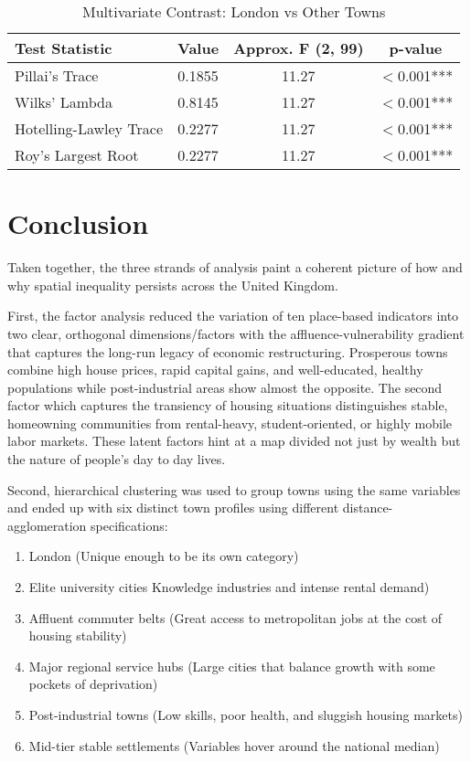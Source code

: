 \documentclass[12pt]{article}
\begin{document}
\begin{table}[htbp]
\centering
\caption{Multivariate Contrast: London vs Other Towns}
\label{tab:london_vs_other}
\begin{tabular}{lccc}
\hline
\textbf{Test Statistic} & \textbf{Value} & \textbf{Approx. F (2, 99)} & \textbf{p-value} \\
\hline
Pillai's Trace & 0.1855 & 11.27 & $<$0.001*** \\
Wilks' Lambda & 0.8145 & 11.27 & $<$0.001*** \\
Hotelling-Lawley Trace & 0.2277 & 11.27 & $<$0.001*** \\
Roy's Largest Root & 0.2277 & 11.27 & $<$0.001*** \\
\hline
\end{tabular}
\end{table}

\section{Conclusion}
Taken together, the three strands of analysis paint a coherent picture of how and why spatial inequality persists across the United Kingdom.

First, the factor analysis reduced the variation of ten place-based indicators into two clear, orthogonal dimensions/factors with the affluence-vulnerability gradient that captures the long-run legacy of economic restructuring. Prosperous towns combine high house prices, rapid capital gains, and well-educated, healthy populations while post-industrial areas show almost the opposite. The second factor which captures the transiency of housing situations distinguishes stable, homeowning communities from rental-heavy, student-oriented, or highly mobile labor markets. These latent factors hint at a map divided not just by wealth but the nature of people's day to day lives.

Second, hierarchical clustering was used to group towns using the same variables and ended up with six distinct town profiles using different distance-agglomeration specifications:

\begin{enumerate}
    \item London (Unique enough to be its own category)
    \item Elite university cities Knowledge industries and intense rental demand)
    \item Affluent commuter belts (Great access to metropolitan jobs at the cost of housing stability)
    \item Major regional service hubs (Large cities that balance growth with some pockets of deprivation)
    \item Post-industrial towns (Low skills, poor health, and sluggish housing markets)
    \item Mid-tier stable settlements (Variables hover around the national median)
\end{enumerate}
\end{document}
